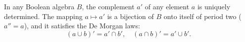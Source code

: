 In any Boolean algebra $B$, the complement $a'$ of any element $a$ is uniquely determined. The mapping $a \mapsto a'$ is a bijection of $B$ onto itself of period two ($a'' = a$), and it satisfies the De Morgan laws:
$$(a \cup b)' = a' \cap b', \quad (a \cap b)' = a' \cup b'.$$
